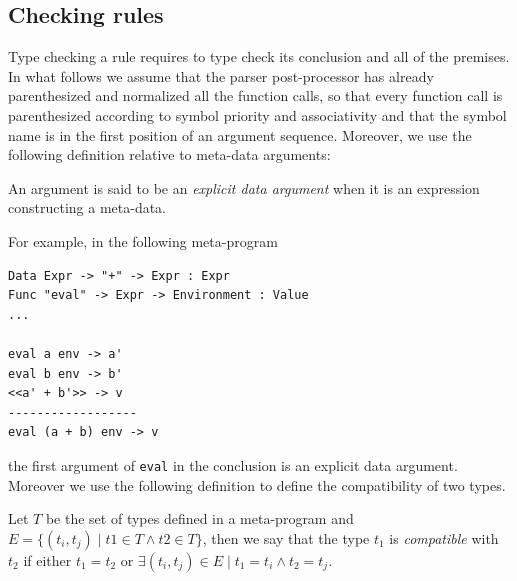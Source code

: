 \subsection{Checking rules}
Type checking a rule requires to type check its conclusion and all of the premises. In what follows we assume that the parser post-processor has already parenthesized and normalized all the function calls, so that every function call is parenthesized according to symbol priority and associativity and that the symbol name is in the first position of an argument sequence. Moreover, we use the following definition relative to meta-data arguments:

\begin{definition}
	An argument is said to be an \textit{explicit data argument} when it is an expression constructing a meta-data.
\end{definition}

\noindent
For example, in the following meta-program

\begin{lstlisting}[caption = Example of an explicit data argument in Metacasanova,  label = code:ch_metacasanova_explicit_data_argument]
Data Expr -> "+" -> Expr : Expr
Func "eval" -> Expr -> Environment : Value
...

eval a env -> a'
eval b env -> b'
<<a' + b'>> -> v
------------------
eval (a + b) env -> v
\end{lstlisting}

\noindent
the first argument of \texttt{eval} in the conclusion is an explicit data argument. Moreover we use the following definition to define the compatibility of two types.

\begin{definition}
\label{def:ch_metacasanova_type_compatibility}
	Let $T$ be the set of types defined in a meta-program and $E = \lbrace (t_i,t_j) \; | \; t1 \in T \wedge t2 \in T \rbrace$, then we say that the type $t_1$ is \textit{compatible} with $t_2$ if either $t_1 = t_2$ or $\exists (t_i,t_j) \in E \; | \; t_1 = t_i \wedge t_2 = t_j$.
\end{definition}

